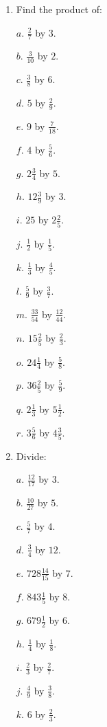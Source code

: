 \documentclass{book}
\begin{document}
\begin{enumerate}
$g$. $2 \frac{1}{5}$ from $5 \frac{1}{2}$.

$h$. $6 \frac{3}{5}$ from $15 \frac{3}{6}$.

$i$. $27 \frac{7}{8}$ from $29 \frac{1}{3}$.

\item Find the product of:

$a$. $\frac{2}{7}$ by $3$.

$b$. $\frac{3}{10}$ by $2$.

$c$. $\frac{3}{8}$ by $6$.

$d$. $5$ by $\frac{2}{9}$.

$e$. $9$ by $\frac{7}{18}$.

$f$. $4$ by $\frac{5}{6}$.

$g$. $2 \frac{3}{4}$ by $5$.

$h$. $12 \frac{3}{9}$ by $3$.

$i$. $25$ by $2 \frac{2}{5}$.

$j$. $\frac{1}{2}$ by $\frac{1}{5}$.

$k$. $\frac{1}{3}$ by $\frac{4}{5}$.

$l$. $\frac{5}{9}$ by $\frac{3}{7}$.

$m$. $\frac{33}{54}$ by $\frac{12}{44}$.

$n$. $15 \frac{2}{5}$ by $\frac{2}{3}$.

$o$. $24 \frac{1}{4}$ by $\frac{5}{8}$.

$p$. $36 \frac{2}{5}$ by $\frac{5}{9}$.

$q$. $2 \frac{1}{3}$ by $5 \frac{1}{2}$.

$r$. $3 \frac{5}{6}$ by $4 \frac{3}{5}$.

\item Divide:

$a$. $\frac{12}{17}$ by $3$.

$b$. $\frac{10}{27}$ by $5$.

$c$. $\frac{5}{7}$ by $4$.

$d$. $\frac{3}{4}$ by $12$.

$e$. $728 \frac{14}{15}$ by $7$.

$f$. $843 \frac{1}{5}$ by $8$.

$g$. $679 \frac{1}{2}$ by $6$.

$h$. $\frac{1}{4}$ by $\frac{1}{8}$.

$i$. $\frac{2}{3}$ by $\frac{2}{7}$.

$j$. $\frac{4}{9}$ by $\frac{3}{8}$.

$k$. $6$ by $\frac{2}{3}$.


\end{enumerate}
\end{document}

